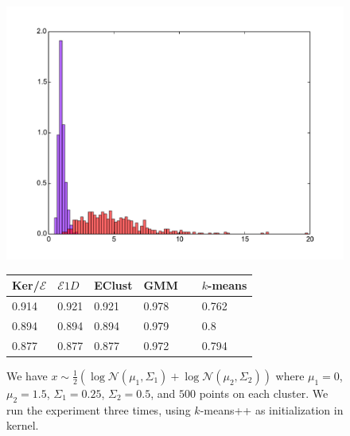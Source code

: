 \documentclass[aps,preprint,nofootinbib,floatfix]{revtex4-1}
\begin{document}
\begin{figure}[h]
\begin{minipage}{.49\textwidth}
\includegraphics[scale=.45]{hist_loggauss1.pdf}
\end{minipage}
\begin{minipage}{.49\textwidth}
\begin{tabular}{ l l l l l}
\hline
Ker/$\mathcal{E}$ & $\mathcal{E} 1D$ & EClust & GMM~~ & $k$-means \\
\hline
0.914 &
0.921 &
0.921 &
0.978 &
0.762 \\
0.894 &
0.894 &
0.894 &
0.979 &
0.8 \\
0.877 &
0.877 &
0.877 &
0.972 &
0.794 \\
\hline
\end{tabular}
\end{minipage}
\caption{\label{fig:1dloggaus1}
We have $x \sim \tfrac{1}{2}\left( \log \mathcal{N}(\mu_1, \Sigma_1) +
\log \mathcal{N}(\mu_2, \Sigma_2)\right)$ where $\mu_1 = 0$, $\mu_2=1.5$,
$\Sigma_1 = 0.25$, $ \Sigma_2 = 0.5$,
and $500$ points on each cluster. We run the experiment three times,
using $k$-means++ as initialization in kernel.
}
\end{figure}
\end{document}
